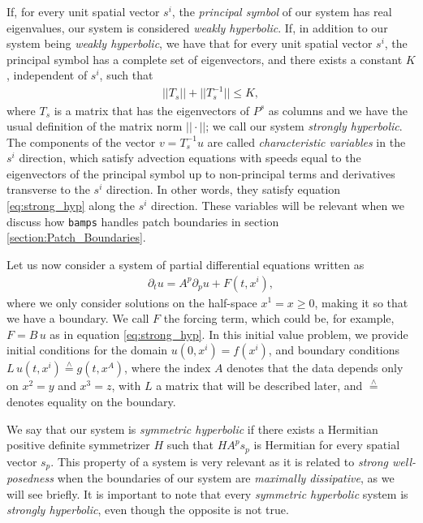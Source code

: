 If, for every unit spatial vector $s^i$, the \textit{principal symbol} of our system has real eigenvalues, our system is considered \textit{weakly hyperbolic}. If, in addition to our system being \textit{weakly hyperbolic}, we have that for every unit spatial vector $s^i$, the principal symbol has a complete set of eigenvectors, and there exists a constant $K$, independent of $s^i$, such that
%
\begin{align}
    ||T_s|| + ||T_s^{-1}|| \leq K,
\end{align}
%
where $T_s$ is a matrix that has the eigenvectors of $P^s$ as columns and we have the usual definition of the matrix norm $||\cdot||$; we call our system \textit{strongly hyperbolic}. The components of the vector $v = T^{-1}_s u$ are called \textit{characteristic variables} in the $s^i$ direction, which satisfy advection equations with speeds equal to the eigenvectors of the principal symbol up to non-principal terms and derivatives transverse to the $s^i$ direction. In other words, they satisfy equation \eqref{eq:strong_hyp} along the $s^i$ direction. These variables will be relevant when we discuss how \texttt{bamps} handles patch boundaries in section \ref{section:Patch_Boundaries}.


Let us now consider a system of partial differential equations written as
\begin{align}
    \partial_t u = A^p \partial_p u + F(t,x^i),
\end{align}
%
where we only consider solutions on the half-space $x^1 = x\geq 0$, making it so that we have a boundary. We call $F$ the forcing term, which could be, for example, $F = B \, u$ as in equation \eqref{eq:strong_hyp}. In this initial value problem, we provide initial conditions for the domain $u(0,x^i)=f(x^i)$, and boundary conditions $L\, u(t,x^i) \stackrel{\wedge}{=} g(t,x^A)$, where the index $A$ denotes that the data depends only on $x^2 = y$ and $x^3=z$, with $L$ a matrix that will be described later, and $\stackrel{\wedge}{=}$ denotes equality on the boundary.

We say that our system is \textit{symmetric hyperbolic} if there exists a Hermitian positive definite symmetrizer $H$ such that $H A^p s_p$ is Hermitian for every spatial vector $s_p$. This property of a system is very relevant as it is related to \textit{strong well-posedness} when the boundaries of our system are \textit{maximally dissipative}, as we will see briefly. It is important to note that every \textit{symmetric hyperbolic} system is \textit{strongly hyperbolic}, even though the opposite is not true.

